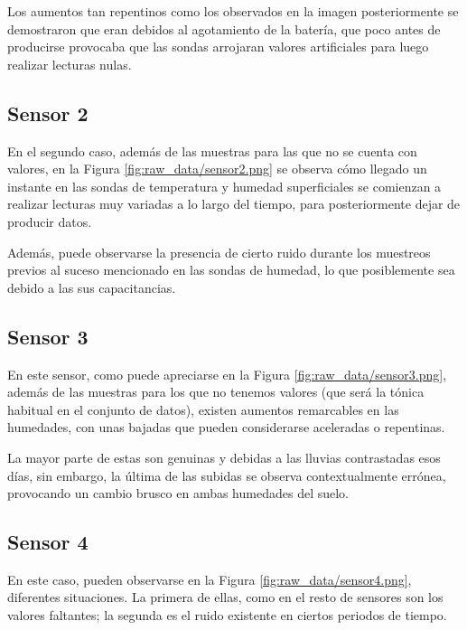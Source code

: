 Los aumentos tan repentinos como los observados en la imagen posteriormente se demostraron
que eran debidos al agotamiento de la batería, que poco antes
de producirse provocaba que las sondas arrojaran valores artificiales para luego realizar lecturas nulas.

\subsection{Sensor 2}


En el segundo caso, además de las muestras para las que no se cuenta con valores,
en la Figura \ref{fig:raw_data/sensor2.png} se observa cómo llegado un instante en
las sondas de temperatura y humedad superficiales se comienzan a realizar lecturas
muy variadas a lo largo del tiempo, para posteriormente dejar de producir datos.

Además, puede observarse la presencia de cierto ruido durante los muestreos previos
al suceso mencionado en las sondas de humedad, lo que posiblemente sea debido a 
las sus capacitancias.

\newpage
\subsection{Sensor 3}


En este sensor, como puede apreciarse en la Figura \ref{fig:raw_data/sensor3.png},
además de las muestras para los que no tenemos valores (que será la tónica habitual
en el conjunto de datos), existen aumentos remarcables en las humedades, con unas
bajadas que pueden considerarse aceleradas o repentinas.

La mayor parte de estas son genuinas y debidas a las lluvias contrastadas esos días, sin 
embargo, la última de las subidas se observa contextualmente errónea, provocando 
un cambio brusco en ambas humedades del suelo.

\newpage
\subsection{Sensor 4}


En este caso, pueden observarse en la Figura \ref{fig:raw_data/sensor4.png}, diferentes
situaciones. La primera de ellas, como en el resto de sensores son los valores faltantes; la
segunda es el ruido existente en ciertos periodos de tiempo.


